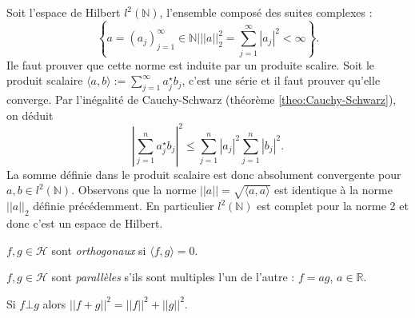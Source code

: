 \begin{example}
    Soit l'espace de Hilbert $l^2(\mathbb{N})$, l'ensemble composé des suites complexes :
    \begin{equation*}
        \left\{ a = (a_j)_{j=1}^\infty\in\mathbb{N} \bigg| ||a||_2^2 = \sum_{j=1}^\infty |a_j|^2 < \infty \right\}.
    \end{equation*}
    Ile faut prouver que cette norme est induite par un produite scalire. Soit le produit scalaire $\langle a,b \rangle := \sum_{j=1}^\infty a_j^\star b_j$, c'est une série et il faut prouver qu'elle converge. Par l'inégalité de Cauchy-Schwarz (théorème \ref{theo:Cauchy-Schwarz}), on déduit
    \begin{equation*}
        \left|\sum_{j=1}^n a_j^\star b_j\right|^2 \leq \sum_{j=1}^n |a_j|^2 \sum_{j=1}^n |b_j|^2.
    \end{equation*}
    La somme définie dans le produit scalaire est donc absolument convergente pour $a,b\in l^2(\mathbb{N})$. Observons que la norme $||a||=\sqrt{\langle a,a \rangle}$ est identique à la norme $||a||_2$ définie précédemment. En particulier $l^2(\mathbb{N})$ est complet pour la norme 2 et donc c'est un espace de Hilbert.
\end{example}

\begin{definition}
    $f,g\in\mathcal{H}$ sont \textit{orthogonaux} si $\langle f,g \rangle = 0.$
\end{definition}

\begin{definition}
    $f,g\in\mathcal{H}$ sont \textit{parallèles} s'ils sont multiples l'un de l'autre : $ f = ag$, $a\in\mathbb{R}$.
\end{definition}

\begin{theo}[Pythagore]
    Si $f\bot g$ alors $||f+g||^2 = ||f||^2 + ||g||^2$. \label{theo:pythagore}
\end{theo}

